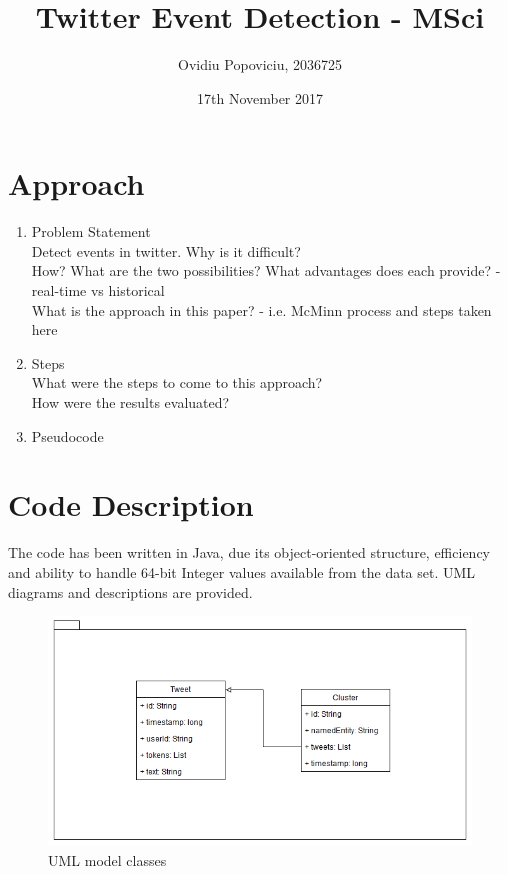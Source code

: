 \documentclass[a4paper,portrait,12pt]{article}
\begin{document}
\setlength{\oddsidemargin}{0.9847in-1in}
\setlength{\textwidth}{\paperwidth - 0.9847in-0.9847in}


%
% 
\author{Ovidiu Popoviciu, 2036725}
\date{17th November 2017}
\title{Twitter Event Detection - MSci}
\maketitle

\section{Approach}
\cite{McMinn2013} \cite{McMinn2015}
\begin{enumerate}
    \item Problem Statement \\
    Detect events in twitter. Why is it difficult?\\
    How? What are the two possibilities? What advantages does each provide? - real-time vs historical \\
    What is the approach in this paper? - i.e. McMinn process and steps taken here
    \item Steps\\
    What were the steps to come to this approach? \\
    How were the results evaluated? \\
    \item Pseudocode
\end{enumerate}

\section{Code Description}
The code has been written in Java, due its object-oriented structure, efficiency and ability to handle 64-bit Integer values available from the data set.
UML diagrams and descriptions are provided.\\

\begin{figure}[h!]
\centering
  \includegraphics[width=0.5\linewidth]{images/modelUML.png}        
  \caption{UML model classes}
  \label{fig:modelUML}
\end{figure}
\end{document}
